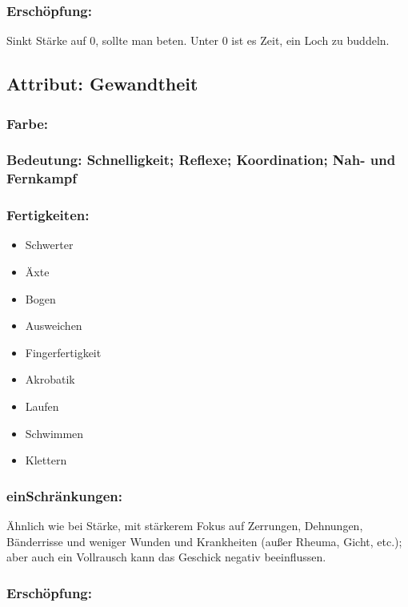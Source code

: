 \subsubsection{Erschöpfung:}

Sinkt Stärke auf 0, sollte man beten. Unter 0 ist es Zeit, ein Loch zu buddeln.

\subsection{Attribut: Gewandtheit}

\subsubsection{Farbe: \pik}

\subsubsection{Bedeutung: Schnelligkeit; Reflexe; Koordination; Nah- und Fernkampf}

\subsubsection{Fertigkeiten:}
\begin{itemize}
\item Schwerter
\item Äxte
\item Bogen
\item Ausweichen
\item Fingerfertigkeit
\item Akrobatik
\item Laufen
\item Schwimmen
\item Klettern
\end{itemize}

\subsubsection{einSchränkungen:}

Ähnlich wie bei Stärke, mit stärkerem Fokus auf Zerrungen, Dehnungen, Bänderrisse und weniger Wunden und Krankheiten (außer Rheuma, Gicht, etc.); aber auch ein Vollrausch kann das Geschick negativ beeinflussen.

\subsubsection{Erschöpfung:}

